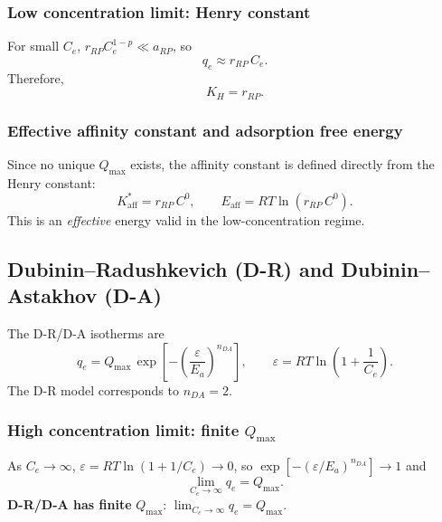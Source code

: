 \documentclass[journal=jacsat,manuscript=article]{achemso}
\begin{document}
\subsubsection{Low concentration limit: Henry constant}

For small $C_e$, $r_{RP}C_e^{1-p} \ll a_{RP}$, so
\begin{equation}
	q_e \approx r_{RP}\, C_e.
\end{equation}
Therefore,
\begin{equation}
	\boxed{K_H = r_{RP}.}
\end{equation}

\subsubsection{Effective affinity constant and adsorption free energy}

Since no unique $Q_{\max}$ exists, the affinity constant is defined directly from the Henry constant:
\begin{equation}
	\boxed{
		K_{\mathrm{aff}}^{\ast} = r_{RP}\, C^0,
		\qquad
		E_{\mathrm{aff}} = RT\ln(r_{RP}\, C^0).
	}
\end{equation}
This is an \emph{effective} energy valid in the low-concentration regime.

\subsection{Dubinin--Radushkevich (D-R) and Dubinin--Astakhov (D-A)}
\label{sec:si_dr_da}

The D-R/D-A isotherms are
\begin{equation}
	q_e = Q_{\max}\,\exp\!\left[-\left(\frac{\varepsilon}{E_a}\right)^{n_{DA}}\right],
	\qquad
	\varepsilon = RT\ln\!\left(1 + \frac{1}{C_e}\right).
	\label{eq:si_dr_da}
\end{equation}
The D-R model corresponds to $n_{DA} = 2$.

\subsubsection{High concentration limit: finite $Q_{\max}$}

As $C_e \to \infty$, $\varepsilon = RT\ln(1+1/C_e) \to 0$, so
$\exp[-(\varepsilon/E_a)^{n_{DA}}] \to 1$ and
\begin{equation}
	\lim_{C_e \to \infty} q_e = Q_{\max}.
\end{equation}
\textbf{D-R/D-A has finite }$Q_{\max}$:\quad
$\displaystyle \lim_{C_e \to \infty} q_e = Q_{\max}$.
\end{document}
